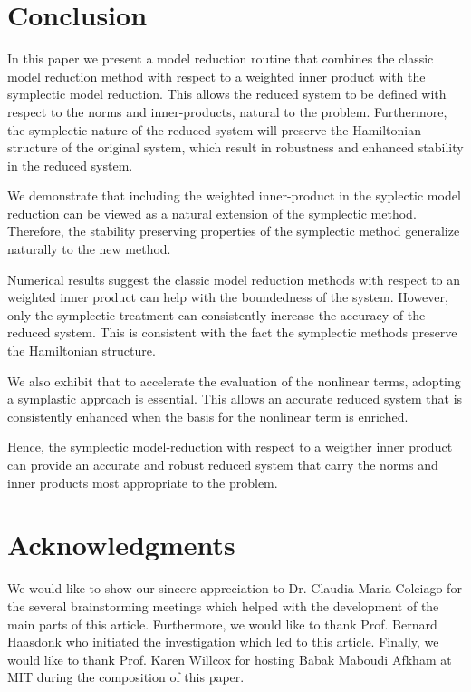 \section{Conclusion} \label{sec:conc}
In this paper we present a model reduction routine that combines the classic model reduction method with respect to a weighted inner product with the symplectic model reduction. This allows the reduced system to be defined with respect to the norms and inner-products, natural to the problem. Furthermore, the symplectic nature of the reduced system will preserve the Hamiltonian structure of the original system, which result in robustness and enhanced stability in the reduced system.

We demonstrate that including the weighted inner-product in the syplectic model reduction can be viewed as a natural extension of the symplectic method. Therefore, the stability preserving properties of the symplectic method generalize naturally to the new method.

Numerical results suggest the classic model reduction methods with respect to an weighted inner product can help with the boundedness of the system. However, only the symplectic treatment can consistently increase the accuracy of the reduced system. This is consistent with the fact the symplectic methods preserve the Hamiltonian structure.

We also exhibit that to accelerate the evaluation of the nonlinear terms, adopting a symplastic approach is essential. This allows an accurate reduced system that is consistently enhanced when the basis for the nonlinear term is enriched.

Hence, the symplectic model-reduction with respect to a weigther inner product can provide an accurate and robust reduced system that carry the norms and inner products most appropriate to the problem.

\section*{Acknowledgments} We would like to show our sincere appreciation to Dr. Claudia Maria Colciago for the several brainstorming meetings which helped with the development of the main parts of this article. Furthermore, we would like to thank Prof. Bernard Haasdonk who initiated the investigation which led to this article. Finally, we would like to thank Prof. Karen Willcox for hosting Babak Maboudi Afkham at MIT during the composition of this paper. 
